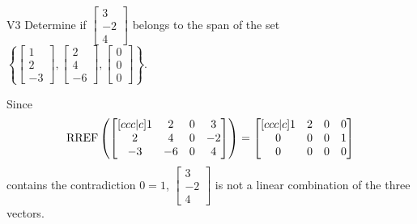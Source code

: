 \begin{problem}{V3}
  Determine if
  \(\begin{bmatrix} 3 \\ -2 \\ 4 \end{bmatrix}\)
  belongs to the span of the set
  \(\left\{
    \begin{bmatrix} 1 \\ 2 \\ -3 \end{bmatrix},
    \begin{bmatrix} 2 \\ 4 \\ -6 \end{bmatrix},
    \begin{bmatrix} 0 \\ 0 \\ 0 \end{bmatrix}
    \right\}
  \).
\end{problem}
\begin{solution}
  Since
  \[
    \operatorname{RREF}\left(
      \begin{bmatrix}[ccc|c]
        1 & 2 & 0 & 3 \\
        2 & 4 & 0 & -2 \\
        -3 & -6 & 0 & 4
      \end{bmatrix}
    \right) =
    \begin{bmatrix}[ccc|c]
      1 & 2 & 0 & 0 \\
      0 & 0 & 0 & 1 \\
      0 & 0 & 0 & 0
    \end{bmatrix}
  \]
  contains the contradiction \(0=1\),
  \(\begin{bmatrix} 3 \\ -2 \\ 4 \end{bmatrix}\) is
  not a linear combination of the three vectors.
\end{solution}
